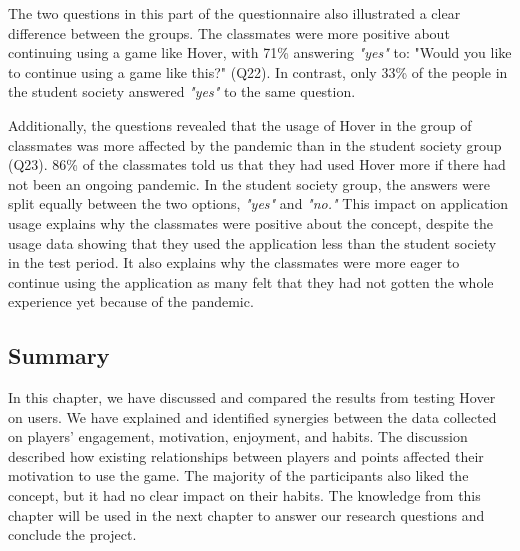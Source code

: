 The two questions in this part of the questionnaire also illustrated a clear difference between the groups. The classmates were more positive about continuing using a game like Hover, with 71\% answering \textit{"yes"} to: "Would you like to continue using a game like this?" (Q22). In contrast, only 33\% of the people in the student society answered \textit{"yes"} to the same question.

Additionally, the questions revealed that the usage of Hover in the group of classmates was more affected by the pandemic than in the student society group (Q23). 86\% of the classmates told us that they had used Hover more if there had not been an ongoing pandemic. In the student society group, the answers were split equally between the two options, \textit{"yes"} and \textit{"no."} This impact on application usage explains why the classmates were positive about the concept, despite the usage data showing that they used the application less than the student society in the test period. It also explains why the classmates were more eager to continue using the application as many felt that they had not gotten the whole experience yet because of the pandemic.


\subsection{Summary}
In this chapter, we have discussed and compared the results from testing Hover on users. We have explained and identified synergies between the data collected on players’ engagement, motivation, enjoyment, and habits. The discussion described how existing relationships between players and points affected their motivation to use the game. The majority of the participants also liked the concept, but it had no clear impact on their habits. The knowledge from this chapter will be used in the next chapter to answer our research questions and conclude the project.
